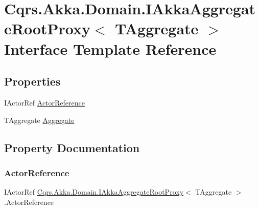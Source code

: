 \hypertarget{interfaceCqrs_1_1Akka_1_1Domain_1_1IAkkaAggregateRootProxy}{}\section{Cqrs.\+Akka.\+Domain.\+I\+Akka\+Aggregate\+Root\+Proxy$<$ T\+Aggregate $>$ Interface Template Reference}
\label{interfaceCqrs_1_1Akka_1_1Domain_1_1IAkkaAggregateRootProxy}
\subsection*{Properties}
\begin{DoxyCompactItemize}
\item 
I\+Actor\+Ref \hyperlink{interfaceCqrs_1_1Akka_1_1Domain_1_1IAkkaAggregateRootProxy_a82fada7255b8aae10e273561724e7098}{Actor\+Reference}
\item 
T\+Aggregate \hyperlink{interfaceCqrs_1_1Akka_1_1Domain_1_1IAkkaAggregateRootProxy_a56fbd69562431a4b35864a90f446134b}{Aggregate}
\end{DoxyCompactItemize}


\subsection{Property Documentation}
\mbox{\label{interfaceCqrs_1_1Akka_1_1Domain_1_1IAkkaAggregateRootProxy_a82fada7255b8aae10e273561724e7098}} 
\subsubsection{\texorpdfstring{Actor\+Reference}{ActorReference}}
{\footnotesize\ttfamily I\+Actor\+Ref \hyperlink{interfaceCqrs_1_1Akka_1_1Domain_1_1IAkkaAggregateRootProxy}{Cqrs.\+Akka.\+Domain.\+I\+Akka\+Aggregate\+Root\+Proxy}$<$ T\+Aggregate $>$.Actor\+Reference\hspace{0.3cm}{\ttfamily [get]}}

